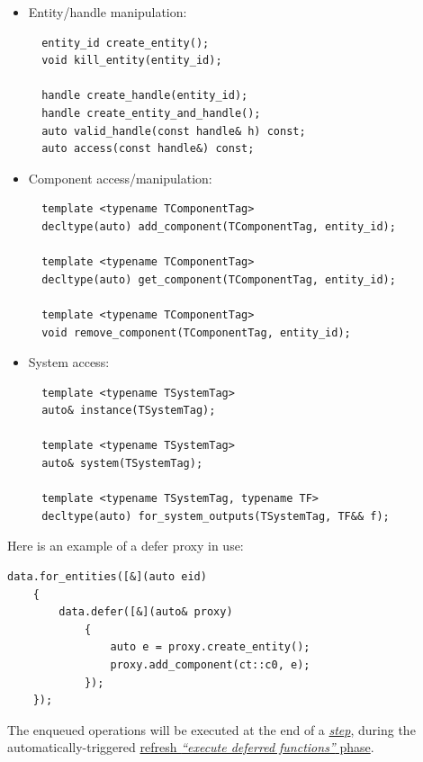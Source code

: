 \documentclass[twoside, 12pt, a4paper, openright]{book}
\begin{document}
\begin{itemize}
\item
  Entity/handle manipulation:

  \begin{verbatim}
  entity_id create_entity();
  void kill_entity(entity_id);

  handle create_handle(entity_id);
  handle create_entity_and_handle();
  auto valid_handle(const handle& h) const;
  auto access(const handle&) const;
  \end{verbatim}
\item
  Component access/manipulation:

  \begin{verbatim}
  template <typename TComponentTag>
  decltype(auto) add_component(TComponentTag, entity_id);

  template <typename TComponentTag>
  decltype(auto) get_component(TComponentTag, entity_id);

  template <typename TComponentTag>
  void remove_component(TComponentTag, entity_id);
  \end{verbatim}
\item
  System access:

  \begin{verbatim}
  template <typename TSystemTag>
  auto& instance(TSystemTag);

  template <typename TSystemTag>
  auto& system(TSystemTag);

  template <typename TSystemTag, typename TF>
  decltype(auto) for_system_outputs(TSystemTag, TF&& f);
  \end{verbatim}
\end{itemize}

Here is an example of a defer proxy in use:

\begin{verbatim}
data.for_entities([&](auto eid)
    {
        data.defer([&](auto& proxy)
            {
                auto e = proxy.create_entity();
                proxy.add_component(ct::c0, e);
            });
    });
\end{verbatim}

The enqueued operations will be executed at the end of a
\protect\hyperlink{step_stage}{\emph{step}}, during the
automatically-triggered \protect\hyperlink{flow_exec_dfuncs}{refresh
\emph{``execute deferred functions''} phase}.
\end{document}
